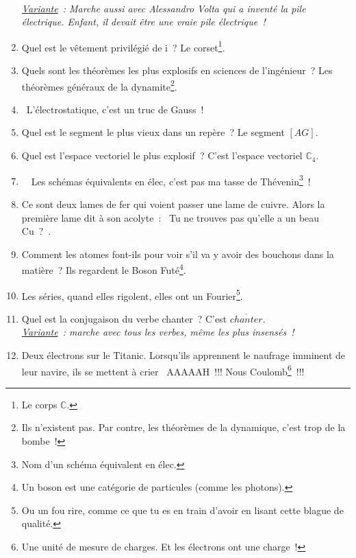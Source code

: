 \documentclass[10pt,a5paper,fullpage]{book}
\begin{document}
\begin{enumerate}
		\\\textit{\underline{Variante}~: Marche aussi avec Alessandro Volta qui a inventé la pile électrique. Enfant, il devait être une vraie pile électrique~!} 
		\item Quel est le vêtement privilégié de i~? Le corset\footnote{Le corps $\mathbb{C}$.}.
		\item Quels sont les théorèmes les plus explosifs en sciences de l’ingénieur~? Les théorèmes généraux de la dynamite\footnote{Ils n’existent pas. Par contre, les théorèmes de la dynamique, c’est trop de la bombe~!}.
		\item \guillemotleft~L’électrostatique, c’est un truc de Gauss~!~\guillemotright
		\item Quel est le segment le plus vieux dans un repère~? Le segment $[AG]$.
		\item Quel est l’espace vectoriel le plus explosif~? C’est l’espace vectoriel $\mathbb{C}_{4}$.
		\item \guillemotleft~ Les schémas équivalents en élec, c’est pas ma tasse de Thévenin\footnote{Nom d’un schéma équivalent en élec.}~! ~\guillemotright
		\item Ce sont deux lames de fer qui voient passer une lame de cuivre. Alors la première lame dit à son acolyte~: \guillemotleft~Tu ne trouves pas qu’elle a un beau Cu~?~\guillemotright.
		\item Comment les atomes font-ils pour voir s’il va y avoir des bouchons dans la matière~? Ils regardent le Boson Futé\footnote{Un boson est une catégorie de particules (comme les photons).}.
		\item Les séries, quand elles rigolent, elles ont un Fourier\footnote{Ou un fou rire, comme ce que tu es en train d'avoir en lisant cette blague de qualité.}.
		\item Quel est la conjugaison du verbe chanter~? C’est $\overline{chanter}$. \\\textit{\underline{Variante}~: marche avec tous les verbes, même les plus insensés~!}
		\item Deux électrons sur le Titanic. Lorsqu’ils apprennent le naufrage imminent de leur navire, ils se mettent à crier \guillemotleft~AAAAAH~!!! Nous Coulomb\footnote{Une unité de mesure de charges. Et les électrons ont une charge~!}~!!! ~\guillemotright

\end{enumerate}
\end{document}
